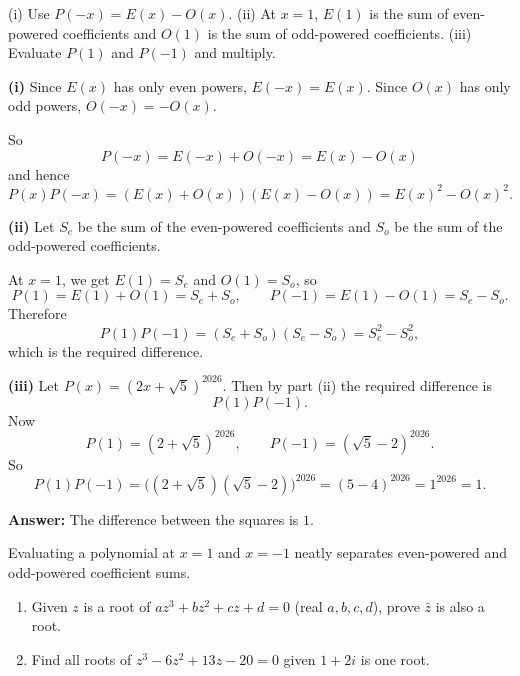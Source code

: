 \vspace{0.5cm}
\begin{hintbox}
(i) Use $P(-x)=E(x)-O(x)$. (ii) At $x=1$, $E(1)$ is the sum of even-powered coefficients and $O(1)$ is the sum of odd-powered coefficients. (iii) Evaluate $P(1)$ and $P(-1)$ and multiply.
\end{hintbox}

\begin{solution}
\textbf{(i)} Since $E(x)$ has only even powers, $E(-x)=E(x)$. Since $O(x)$ has only odd powers, $O(-x)=-O(x)$.

So
$$
P(-x)=E(-x)+O(-x)=E(x)-O(x)
$$
and hence
$$
P(x)P(-x)=(E(x)+O(x))(E(x)-O(x))=E(x)^2-O(x)^2.
$$

\textbf{(ii)} Let $S_e$ be the sum of the even-powered coefficients and $S_o$ be the sum of the odd-powered coefficients.

At $x=1$, we get $E(1)=S_e$ and $O(1)=S_o$, so
$$
P(1)=E(1)+O(1)=S_e+S_o,\qquad P(-1)=E(1)-O(1)=S_e-S_o.
$$
Therefore
$$
P(1)P(-1)=(S_e+S_o)(S_e-S_o)=S_e^2-S_o^2,
$$
which is the required difference.

\textbf{(iii)} Let $P(x)=(2x+\sqrt{5})^{2026}$. Then by part (ii) the required difference is
$$
P(1)P(-1).
$$
Now
$$
P(1)=(2+\sqrt{5})^{2026}, \qquad P(-1)=(\sqrt{5}-2)^{2026}.
$$
So
$$
P(1)P(-1)=\bigl((2+\sqrt{5})(\sqrt{5}-2)\bigr)^{2026}=(5-4)^{2026}=1^{2026}=1.
$$

\textbf{Answer:} The difference between the squares is $1$.
\end{solution}

\begin{takeaways}
Evaluating a polynomial at $x=1$ and $x=-1$ neatly separates even-powered and odd-powered coefficient sums.
\end{takeaways}

\vspace{1cm}

\begin{problem}
\begin{enumerate}
    \item Given $z$ is a root of $az^3 + bz^2 + cz + d = 0$ (real $a,b,c,d$), prove $\bar{z}$ is also a root.
    \item Find all roots of $z^3 - 6z^2 + 13z - 20 = 0$ given $1 + 2i$ is one root.
\end{enumerate}
\end{problem}

